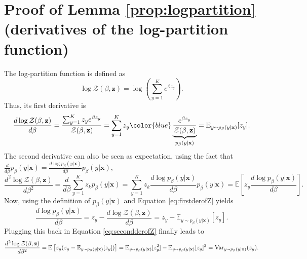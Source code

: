 \documentclass[10pt,dvipsnames]{article}
\newcommand{\bx}{\mathbf{x}}%
\newcommand{\bz}{\mathbf{z}}%
\theoremstyle{plain}
\theoremstyle{definition}
\theoremstyle{remark}
\begin{document}
\section{Proof of Lemma \ref{prop:logpartition} (derivatives of the log-partition function)}
\label{app:logpartition}
The log-partition function is defined as
\begin{equation}
    \log \mathcal{Z}(\beta, \bz) = \log \left( \sum_{y=1}^K e^{\beta z_y}\right).
\end{equation}
Thus, its first derivative is
\begin{equation}
\label{eq:firstderofZ}
    \frac{d \log \mathcal{Z}(\beta, \bz)}{d\beta } = \frac{ \sum_{y=1}^K z_y e^{\beta z_y}}{ \mathcal{Z}(\beta, \bz)} = \sum_{y=1}^K z_y {\color{blue}\underbrace{\frac{e^{\beta z_y}}{\mathcal{Z}(\beta, \bz)}}_{p_\beta(y| \bx)}}=  \mathbb{E}_{y \sim p_\beta(y | \bx)} [ z_y ].
\end{equation}
The second derivative can also be seen as expectation, using the fact that $\frac{d}{d\beta} p_\beta(y | \bx) = \frac{d \log p_\beta(y | \bx)}{d \beta }  p_\beta(y | \bx)$,
\begin{equation}
\label{eq:secondderofZ}
    \frac{d^2 \log \mathcal{Z}(\beta, \bz)}{d\beta^2 } = \frac{d}{d\beta}\sum_{y=1}^K z_k p_\beta(y | \bx) = \sum_{y=1}^K z_k \frac{d \log p_\beta(y | \bx)}{d \beta }  p_\beta(y | \bx) = \mathbb{E} \left[ z_y \frac{d \log p_\beta(y | \bx)}{d \beta } \right ].
\end{equation}
Now, using the definition of $p_\beta(y | \bx)$ and Equation \eqref{eq:firstderofZ} yields
\begin{equation}
    \frac{d \log p_\beta(y | \bx)}{d \beta } = z_y - \frac{d \log \mathcal{Z}(\beta, \bz)}{d\beta } =  z_y - \mathbb{E}_{y \sim p_\beta(y | \bx)} [ z_y ].
\end{equation}
Plugging this back in Equation \eqref{eq:secondderofZ} finally leads to
\begin{equation}
    \frac{d^2 \log \mathcal{Z}(\beta, \bz)}{d\beta^2 } =  \mathbb{E} \left[ z_y (z_y - \mathbb{E}_{y \sim p_\beta(y | \bx)} [ z_y ] ) \right ] = \mathbb{E}_{y \sim p_\beta(y | \bx)}[z_y^2] -  \mathbb{E}_{y \sim p_\beta(y | \bx)}[z_y] ^2 = \textup{Var}_{y \sim p_\beta(y | \bx)} ( z_y ).
\end{equation}
\end{document}
